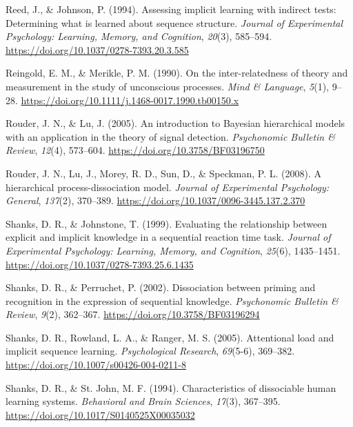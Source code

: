 \documentclass[english,,man]{apa6}
\begin{document}
\leavevmode\hypertarget{ref-reed_assessing_1994}{}%
Reed, J., \& Johnson, P. (1994). Assessing implicit learning with indirect tests: Determining what is learned about sequence structure. \emph{Journal of Experimental Psychology: Learning, Memory, and Cognition}, \emph{20}(3), 585--594. \url{https://doi.org/10.1037/0278-7393.20.3.585}

\leavevmode\hypertarget{ref-reingold_inter-relatedness_1990}{}%
Reingold, E. M., \& Merikle, P. M. (1990). On the inter-relatedness of theory and measurement in the study of unconscious processes. \emph{Mind \& Language}, \emph{5}(1), 9--28. \url{https://doi.org/10.1111/j.1468-0017.1990.tb00150.x}

\leavevmode\hypertarget{ref-rouder_introduction_2005}{}%
Rouder, J. N., \& Lu, J. (2005). An introduction to Bayesian hierarchical models with an application in the theory of signal detection. \emph{Psychonomic Bulletin \& Review}, \emph{12}(4), 573--604. \url{https://doi.org/10.3758/BF03196750}

\leavevmode\hypertarget{ref-rouder_hierarchical_2008}{}%
Rouder, J. N., Lu, J., Morey, R. D., Sun, D., \& Speckman, P. L. (2008). A hierarchical process-dissociation model. \emph{Journal of Experimental Psychology: General}, \emph{137}(2), 370--389. \url{https://doi.org/10.1037/0096-3445.137.2.370}

\leavevmode\hypertarget{ref-shanks_evaluating_1999}{}%
Shanks, D. R., \& Johnstone, T. (1999). Evaluating the relationship between explicit and implicit knowledge in a sequential reaction time task. \emph{Journal of Experimental Psychology: Learning, Memory, and Cognition}, \emph{25}(6), 1435--1451. \url{https://doi.org/10.1037/0278-7393.25.6.1435}

\leavevmode\hypertarget{ref-shanks_dissociation_2002}{}%
Shanks, D. R., \& Perruchet, P. (2002). Dissociation between priming and recognition in the expression of sequential knowledge. \emph{Psychonomic Bulletin \& Review}, \emph{9}(2), 362--367. \url{https://doi.org/10.3758/BF03196294}

\leavevmode\hypertarget{ref-shanks_attentional_2005}{}%
Shanks, D. R., Rowland, L. A., \& Ranger, M. S. (2005). Attentional load and implicit sequence learning. \emph{Psychological Research}, \emph{69}(5-6), 369--382. \url{https://doi.org/10.1007/s00426-004-0211-8}

\leavevmode\hypertarget{ref-shanks_characteristics_1994}{}%
Shanks, D. R., \& St. John, M. F. (1994). Characteristics of dissociable human learning systems. \emph{Behavioral and Brain Sciences}, \emph{17}(3), 367--395. \url{https://doi.org/10.1017/S0140525X00035032}
\end{document}
